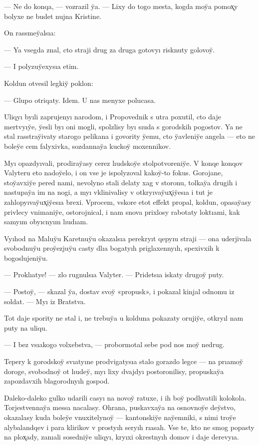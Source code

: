 \documentclass[10pt]{book}
\begin{document}
— Ne do konqa, — vozrazil y̆a. — Lixy do togo mesta, kogda moy̆a pomox̨y bolyxe ne budet nujna Kristine.

On rassmey̆alsıa:

— Ya vsegda znal, cto straji drug za druga gotovyı risknuty golovoy̆.

— I polyzuy̆exysıa etim.

Koldun otvesil legkiy̆ poklon:

— Glupo otriqaty. Idem. U nas menyxe polucasa.

Uliqyı byıli zaprujenyı narodom, i Propovednik s utra poxutil, cto daje mertvyıy̆e, y̆esli byı oni mogli, spolzlisy byı sıuda s gorodskih pogostov. Ya ne stal rasstray̆ivaty starogo pelikana i govority y̆emu, cto y̆avleniy̆e angela — eto ne boley̆e cem falyxivka, sozdannay̆a kuckoy̆ moxennikov.

Myı opazdyıvali, prodiray̆asy cerez lıudskoy̆e stolpotvoreniy̆e. V konqe konqov Valyteru eto nadoy̆elo, i on vse je ispolyzoval kakoy̆-to fokus. Gorojane, stoy̆avxiy̆e pered nami, nevolyno stali delaty xag v storonu, tolkay̆a drugih i nastupay̆a im na nogi, a myı vklinivalisy v otkryıvay̆ux̨iy̆esıa i tut je zahlopyıvay̆ux̨iy̆esıa brexi. Vprocem, vskore etot effekt propal, koldun, opasay̆asy privlecy vnimaniy̆e, ostorojnical, i nam snova prixlosy rabotaty loktıami, kak samyım obyıcnyım lıudıam.

Vyıhod na Maluy̆u Karetnuy̆u okazalsıa perekryıt qepyıu straji — ona uderjivala svobodnuy̆u proy̆ezjuy̆u casty dlıa bogatyıh priglaxennyıh, spexivxih k bogoslujeniy̆u.

— Proklıatye! — zlo rugnulsıa Valyter. — Pridetsıa iskaty drugoy̆ puty.

— Postoy̆, — skazal y̆a, dostav svoy̆ «propusk», i pokazal kinjal odnomu iz soldat. — Myı iz Bratstva.

Tot daje spority ne stal i, ne trebuy̆a u kolduna pokazaty orujiy̆e, otkryıl nam puty na uliqu.

— I bez vsıakogo volxebstva, — probormotal sebe pod nos moy̆ nedrug.

Tepery k gorodskoy̆ svıatyıne prodvigatysıa stalo gorazdo legce — na prıamoy̆ doroge, svobodnoy̆ ot lıudey̆, myı lixy dvajdyı postoronilisy, propuskay̆a zapozdavxih blagorodnyıh gospod.

Daleko-daleko gulko udarili casyı na novoy̆ ratuxe, i ih boy̆ podhvatili kolokola. Torjestvennay̆a messa nacalasy. Ohrana, puskavxay̆a na osnovnoy̆e dey̆stvo, okazalasy kuda boley̆e vnuxitelynoy̆ — kantonskiy̆e nay̆emniki, s nimi troy̆e alybalandqev i para klirikov v prostyıh seryıh rıasah. Vse te, kto ne smog popasty na plox̨ady, zanıali sosedniy̆e uliqyı, kryıxi okrestnyıh domov i daje derevyıa.
\end{document}
